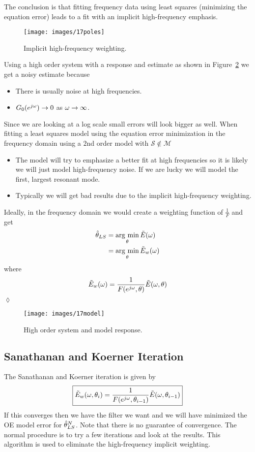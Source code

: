 The conclusion is that fitting frequency data using least squares (minimizing the equation error) leads to a fit with an implicit high-frequency emphasis.

\begin{figure}[ht!]
\centering
\texttt{[image: images/17poles]}
\caption{Implicit high-frequency weighting.}
\label{fig:17poles}
\end{figure}

\begin{example}
Using a high order system with a response and estimate as shown in Figure~\ref{fig:17model} we get a noisy estimate because
\begin{itemize}
\item There is usually noise at high frequencies.
\item $G_0(e^{j\omega})\to0$ as $\omega\to\infty$.
\end{itemize}
Since we are looking at a log scale small errors will look bigger as well.
When fitting a least squares model using the equation error minimization in the frequency domain using a $2$nd order model with $\mathcal{S}\notin\mathcal{M}$
\begin{itemize}
\item The model will try to emphasize a better fit at high frequencies so it is likely we will just model high-frequency noise.
If we are lucky we will model the first, largest resonant mode.
\item Typically we will get bad results due to the implicit high-frequency weighting.
\end{itemize}
Ideally, in the frequency domain we would create a weighting function of $\tfrac{1}{F}$ and get
\begin{align*}
\hat{\theta}_{LS} &= \mathop{\arg\,\min}\limits_\theta\tilde{E}(\omega) \\
&= \mathop{\arg\,\min}\limits_\theta\tilde{E}_w(\omega)
\end{align*}
where
$$\tilde{E}_w(\omega) = \frac{1}{F(e^{j\omega},\theta)}\tilde{E}(\omega,\theta)$$
$\lozenge$
\end{example}

\begin{figure}[ht!]
\centering
\texttt{[image: images/17model]}
\caption{High order system and model response.}
\label{fig:17model}
\end{figure}

\subsection{Sanathanan and Koerner Iteration}
The Sanathanan and Koerner iteration is given by
\begin{align*}
\boxed{\tilde{E}_w(\omega,\theta_i) = \frac{1}{F(e^{j\omega},\theta_{i-1})}\tilde{E}(\omega,\theta_{i-1})}
\end{align*}
If this converges then we have the filter we want and we will have minimized the OE model error for $\hat{\theta}_{LS}^N$.
Note that there is no guarantee of convergence.
The normal procedure is to try a few iterations and look at the results.
This algorithm is used to eliminate the high-frequency implicit weighting.

